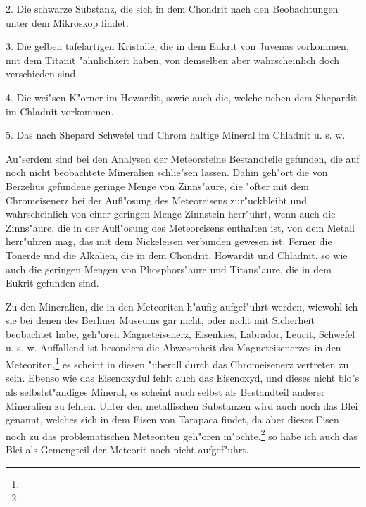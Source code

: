 \documentclass[a4paper, 11pt, oneside]{article}
\begin{document}
2. Die schwarze Substanz, die sich in dem Chondrit nach den Beobachtungen unter dem Mikroskop findet.

3. Die gelben tafelartigen Kristalle, die in dem Eukrit von Juvenas vorkommen, mit dem Titanit "ahnlichkeit haben, von demselben aber wahrscheinlich doch verschieden sind.

4. Die wei"sen K"orner im Howardit, sowie auch die, welche neben dem Shepardit im Chladnit vorkommen.

5. Das nach Shepard Schwefel und Chrom haltige Mineral im Chladnit u. s. w.

Au"serdem sind bei den Analysen der Meteorsteine Bestandteile gefunden, die auf noch nicht beobachtete Mineralien schlie"sen lassen. Dahin geh"ort die von Berzelius gefundene geringe Menge von Zinns"aure, die "ofter mit dem Chromeisenerz bei der Aufl"osung des Meteoreisens zur"uckbleibt und wahrscheinlich von einer geringen Menge Zinnstein herr"uhrt, wenn auch die Zinns"aure, die in der Aufl"osung des Meteoreisens enthalten ist, von dem Metall herr"uhren mag, das mit dem Nickeleisen verbunden gewesen ist. Ferner die Tonerde und die Alkalien, die in dem Chondrit, Howardit und Chladnit, so wie auch die geringen Mengen von Phosphors"aure und Titans"aure, die in dem Eukrit gefunden sind.

Zu den Mineralien, die in den Meteoriten h"aufig aufgef"uhrt werden, wiewohl ich sie bei denen des Berliner Museums gar nicht, oder nicht mit Sicherheit beobachtet habe, geh"oren Magneteisenerz, Eisenkies, Labrador, Leucit, Schwefel u. s. w. Auffallend ist besonders die Abwesenheit des Magneteisenerzes in den Meteoriten,\footnote{} es scheint in diesen "uberall durch das Chromeisenerz vertreten zu sein. Ebenso wie das Eisenoxydul fehlt auch das Eisenoxyd, und dieses nicht blo"s als selbstst"andiges Mineral, es scheint auch selbst als Bestandteil anderer Mineralien zu fehlen. Unter den metallischen Substanzen wird auch noch das Blei genannt, welches sich in dem Eisen von Tarapaca findet, da aber dieses Eisen noch zu das problematischen Meteoriten geh"oren m"ochte,\footnote{} so habe ich auch das Blei als Gemengteil der Meteorit noch nicht aufgef"uhrt.
\end{document}
